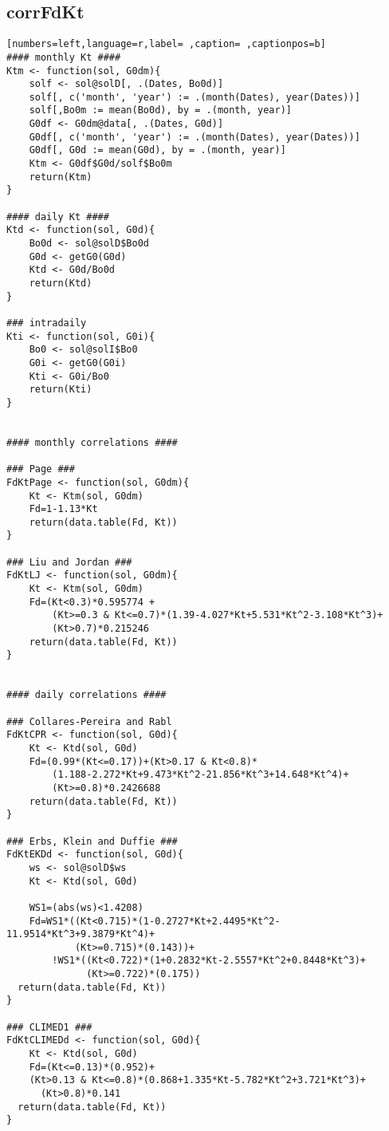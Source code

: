 \subsection{corrFdKt}
\label{sec:orgfe41dbd}
\begin{lstlisting}[numbers=left,language=r,label= ,caption= ,captionpos=b]
#### monthly Kt ####
Ktm <- function(sol, G0dm){
    solf <- sol@solD[, .(Dates, Bo0d)]
    solf[, c('month', 'year') := .(month(Dates), year(Dates))]
    solf[,Bo0m := mean(Bo0d), by = .(month, year)]
    G0df <- G0dm@data[, .(Dates, G0d)]
    G0df[, c('month', 'year') := .(month(Dates), year(Dates))]
    G0df[, G0d := mean(G0d), by = .(month, year)]
    Ktm <- G0df$G0d/solf$Bo0m
    return(Ktm)
}

#### daily Kt ####
Ktd <- function(sol, G0d){
    Bo0d <- sol@solD$Bo0d
    G0d <- getG0(G0d)
    Ktd <- G0d/Bo0d
    return(Ktd)
}

### intradaily
Kti <- function(sol, G0i){
    Bo0 <- sol@solI$Bo0
    G0i <- getG0(G0i)
    Kti <- G0i/Bo0
    return(Kti)
}


#### monthly correlations ####

### Page ###
FdKtPage <- function(sol, G0dm){
    Kt <- Ktm(sol, G0dm)
    Fd=1-1.13*Kt
    return(data.table(Fd, Kt))
}

### Liu and Jordan ###
FdKtLJ <- function(sol, G0dm){
    Kt <- Ktm(sol, G0dm)
    Fd=(Kt<0.3)*0.595774 +
        (Kt>=0.3 & Kt<=0.7)*(1.39-4.027*Kt+5.531*Kt^2-3.108*Kt^3)+
        (Kt>0.7)*0.215246
    return(data.table(Fd, Kt))
}


#### daily correlations ####

### Collares-Pereira and Rabl
FdKtCPR <- function(sol, G0d){
    Kt <- Ktd(sol, G0d)
    Fd=(0.99*(Kt<=0.17))+(Kt>0.17 & Kt<0.8)*
        (1.188-2.272*Kt+9.473*Kt^2-21.856*Kt^3+14.648*Kt^4)+
        (Kt>=0.8)*0.2426688      
    return(data.table(Fd, Kt))
}

### Erbs, Klein and Duffie ###
FdKtEKDd <- function(sol, G0d){
    ws <- sol@solD$ws
    Kt <- Ktd(sol, G0d)

    WS1=(abs(ws)<1.4208)
    Fd=WS1*((Kt<0.715)*(1-0.2727*Kt+2.4495*Kt^2-11.9514*Kt^3+9.3879*Kt^4)+
            (Kt>=0.715)*(0.143))+
        !WS1*((Kt<0.722)*(1+0.2832*Kt-2.5557*Kt^2+0.8448*Kt^3)+
              (Kt>=0.722)*(0.175))
  return(data.table(Fd, Kt))
}

### CLIMED1 ###
FdKtCLIMEDd <- function(sol, G0d){
    Kt <- Ktd(sol, G0d)
    Fd=(Kt<=0.13)*(0.952)+
    (Kt>0.13 & Kt<=0.8)*(0.868+1.335*Kt-5.782*Kt^2+3.721*Kt^3)+
      (Kt>0.8)*0.141
  return(data.table(Fd, Kt))
}


\end{lstlisting}
